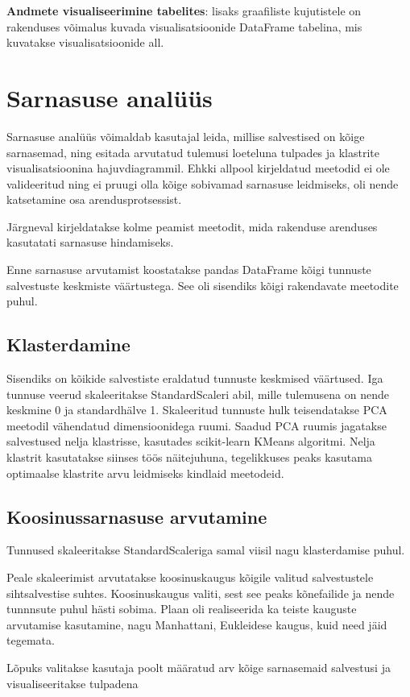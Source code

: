 \textbf{Andmete visualiseerimine tabelites}: lisaks graafiliste kujutistele on rakenduses võimalus kuvada visualisatsioonide DataFrame tabelina, mis kuvatakse visualisatsioonide all.

\section{Sarnasuse analüüs}
Sarnasuse analüüs võimaldab kasutajal leida, millise salvestised on kõige sarnasemad, ning esitada arvutatud tulemusi loeteluna tulpades ja klastrite visualisatsioonina hajuvdiagrammil. Ehkki allpool kirjeldatud meetodid ei ole valideeritud ning ei pruugi olla kõige sobivamad sarnasuse leidmiseks, oli nende katsetamine osa arendusprotsessist.

Järgneval kirjeldatakse kolme peamist meetodit, mida rakenduse arenduses kasutatati sarnasuse hindamiseks. 

Enne sarnasuse arvutamist koostatakse pandas DataFrame kõigi tunnuste salvestuste keskmiste väärtustega. See oli sisendiks kõigi rakendavate meetodite puhul.

\subsection{Klasterdamine}
Sisendiks on kõikide salvestiste eraldatud tunnuste keskmised väärtused. Iga tunnuse veerud skaleeritakse StandardScaleri abil, mille tulemusena on nende keskmine 0 ja standardhälve 1.
Skaleeritud tunnuste hulk teisendatakse PCA meetodil vähendatud dimensioonidega ruumi.
Saadud PCA ruumis jagatakse salvestused nelja klastrisse, kasutades scikit-learn KMeans algoritmi. Nelja klastrit kasutatakse siinses töös näitejuhuna, tegelikkuses peaks kasutama optimaalse klastrite arvu leidmiseks kindlaid meetodeid.

\subsection{Koosinussarnasuse arvutamine}
Tunnused skaleeritakse StandardScaleriga samal viisil nagu klasterdamise puhul.

Peale skaleerimist arvutatakse koosinuskaugus kõigile valitud salvestustele sihtsalvestise suhtes. Koosinuskaugus valiti, sest see peaks kõnefailide ja nende tunnnsute puhul hästi sobima. Plaan oli realiseerida ka teiste kauguste arvutamise kasutamine, nagu Manhattani, Eukleidese kaugus, kuid need jäid tegemata.

Lõpuks valitakse kasutaja poolt määratud arv kõige sarnasemaid salvestusi ja visualiseeritakse tulpadena


